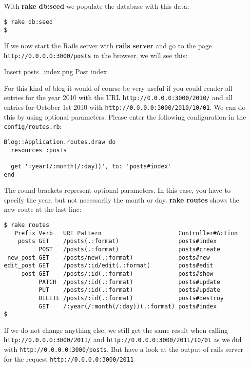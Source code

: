 \documentclass[a4paper]{book}
\newcounter{tab}[chapter]
\begin{document}
With \textbf{rake db:seed} we populate the database with this data:

\begin{shaded}\begin{verbatim}
$ rake db:seed
$
\end{verbatim}\end{shaded}

If we now start the Rails server with \textbf{rails server} and go to the page \texttt{http://0.0.0.0:3000/posts} in the browser, we will see this:

Insert posts\_index.png Post index

For this kind of blog it would of course be very useful if you could render all entries for the year 2010 with the URL \texttt{http://0.0.0.0:3000/2010/} and all entries for October 1st 2010 with \texttt{http://0.0.0.0:3000/2010/10/01}. We can do this by using optional parameters. Please enter the following configuration in the \texttt{config/routes.rb}:

\begin{shaded}\begin{verbatim}
Blog::Application.routes.draw do
  resources :posts

  get ':year(/:month(/:day))', to: 'posts#index'
end
\end{verbatim}\end{shaded}

The round brackets represent optional parameters. In this case, you have to specify the year, but not necessarily the month or day. \textbf{rake routes} shows the new route at the last line:

\begin{shaded}\begin{verbatim}
$ rake routes
   Prefix Verb   URI Pattern                      Controller#Action
    posts GET    /posts(.:format)                 posts#index
          POST   /posts(.:format)                 posts#create
 new_post GET    /posts/new(.:format)             posts#new
edit_post GET    /posts/:id/edit(.:format)        posts#edit
     post GET    /posts/:id(.:format)             posts#show
          PATCH  /posts/:id(.:format)             posts#update
          PUT    /posts/:id(.:format)             posts#update
          DELETE /posts/:id(.:format)             posts#destroy
          GET    /:year(/:month(/:day))(.:format) posts#index
$
\end{verbatim}\end{shaded}

If we do not change anything else, we still get the same result when calling \texttt{http://0.0.0.0:3000/2011/} and \texttt{http://0.0.0.0:3000/2011/10/01} as we did with \texttt{http://0.0.0.0:3000/posts}. But have a look at the output of rails server for the request \texttt{http://0.0.0.0:3000/2011}
\end{document}
